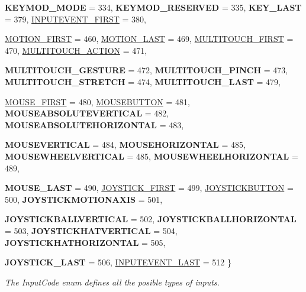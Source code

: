 \begin{DoxyCompactItemize}
{\bfseries KEYMOD\_\-MODE} =  334, 
{\bfseries KEYMOD\_\-RESERVED} =  335, 
{\bfseries KEY\_\-LAST} =  379, 
\hyperlink{classMetaCode_a7390e6f58e25c0ce377bba4e63081b24aa27e8c7d5dc3cc1d726ae82aef44d21c}{INPUTEVENT\_\-FIRST} =  380, 
\par
\hyperlink{classMetaCode_a7390e6f58e25c0ce377bba4e63081b24a21ee5ef5ddcbacbb4a90990ca56ee0a3}{MOTION\_\-FIRST} =  460, 
\hyperlink{classMetaCode_a7390e6f58e25c0ce377bba4e63081b24a1311c6065d4176f097d494bc33001b45}{MOTION\_\-LAST} =  469, 
\hyperlink{classMetaCode_a7390e6f58e25c0ce377bba4e63081b24aae6fbdfa76ec071a3b86d3eec35efa3b}{MULTITOUCH\_\-FIRST} =  470, 
\hyperlink{classMetaCode_a7390e6f58e25c0ce377bba4e63081b24a424167ec6d1df3c1d8ebf5d8fc458387}{MULTITOUCH\_\-ACTION} =  471, 
\par
{\bfseries MULTITOUCH\_\-GESTURE} =  472, 
{\bfseries MULTITOUCH\_\-PINCH} =  473, 
{\bfseries MULTITOUCH\_\-STRETCH} =  474, 
{\bfseries MULTITOUCH\_\-LAST} =  479, 
\par
\hyperlink{classMetaCode_a7390e6f58e25c0ce377bba4e63081b24a98454cf025e1b11ac8978c4b493582c4}{MOUSE\_\-FIRST} =  480, 
\hyperlink{classMetaCode_a7390e6f58e25c0ce377bba4e63081b24a90e6bf109b0decae5cc828ebc5934dfa}{MOUSEBUTTON} =  481, 
{\bfseries MOUSEABSOLUTEVERTICAL} =  482, 
{\bfseries MOUSEABSOLUTEHORIZONTAL} =  483, 
\par
{\bfseries MOUSEVERTICAL} =  484, 
{\bfseries MOUSEHORIZONTAL} =  485, 
{\bfseries MOUSEWHEELVERTICAL} =  485, 
{\bfseries MOUSEWHEELHORIZONTAL} =  489, 
\par
{\bfseries MOUSE\_\-LAST} =  490, 
\hyperlink{classMetaCode_a7390e6f58e25c0ce377bba4e63081b24aa3222db6ab303f525a1a0c87603d806c}{JOYSTICK\_\-FIRST} =  499, 
\hyperlink{classMetaCode_a7390e6f58e25c0ce377bba4e63081b24ab52ae2c161faf882271ec71ded86501f}{JOYSTICKBUTTON} =  500, 
{\bfseries JOYSTICKMOTIONAXIS} =  501, 
\par
{\bfseries JOYSTICKBALLVERTICAL} =  502, 
{\bfseries JOYSTICKBALLHORIZONTAL} =  503, 
{\bfseries JOYSTICKHATVERTICAL} =  504, 
{\bfseries JOYSTICKHATHORIZONTAL} =  505, 
\par
{\bfseries JOYSTICK\_\-LAST} =  506, 
\hyperlink{classMetaCode_a7390e6f58e25c0ce377bba4e63081b24ad1ca5de26bcaae04a631fdaa13e5749f}{INPUTEVENT\_\-LAST} =  512
 \}
\begin{DoxyCompactList}\small\item\em The InputCode enum defines all the posible types of inputs. \item\end{DoxyCompactList}\item 

\end{DoxyCompactItemize}
